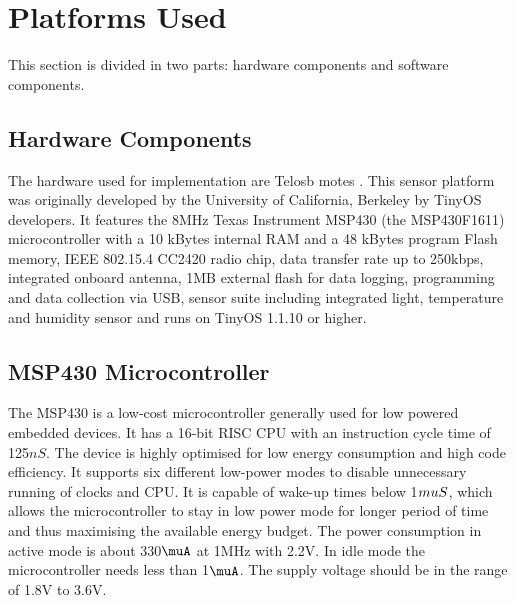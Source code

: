 \section{Platforms Used} \label{sec:PlatformsUsed}

This section is divided in two parts: hardware components and software components.

    \subsection{Hardware Components}
    
    The hardware used for implementation are Telosb motes \cite{datasheet:Telosb}. This sensor platform was originally developed by the University of California, Berkeley by TinyOS developers. It features the 8MHz Texas Instrument MSP430 (the MSP430F1611) microcontroller with a 10 kBytes internal RAM and a 48 kBytes program Flash memory, IEEE 802.15.4 CC2420 radio chip, data transfer rate up to 250kbps, integrated onboard antenna, 1MB external flash for data logging, programming and data collection via USB, sensor suite including integrated light,  temperature and humidity sensor and runs on TinyOS 1.1.10 or higher.
    
    \subsection*{MSP430 Microcontroller}
    
    The MSP430 \cite{website-MSP430} is a low-cost microcontroller generally used for low powered embedded devices. It has a 16-bit \ac{RISC} CPU with an instruction cycle time of 125$nS$. The device is highly optimised for low energy consumption and high code efficiency. It supports six different low-power modes to disable unnecessary running of clocks and CPU. It is capable of wake-up times below 1$\\muS$, which allows the microcontroller to stay in low power mode for longer period of time and thus maximising the available energy budget. The power consumption in active mode is about 330$\muA$ at 1MHz with 2.2V. In idle mode the microcontroller needs less than 1$\muA$. The supply voltage should be in the range of 1.8V to 3.6V.
    
